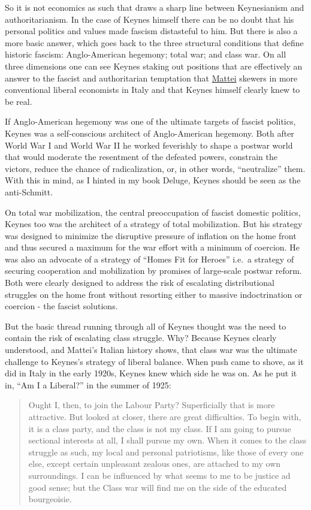 \documentclass[
]{book}
\begin{document}
So it is not economics as such that draws a sharp line between Keynesianism and authoritarianism. In the case of Keynes himself there can be no doubt that his personal politics and values made fascism distasteful to him. But there is also a more basic answer, which goes back to the three structural conditions that define historic fascism: Anglo-American hegemony; total war; and class war. On all three dimensions one can see Keynes staking out positions that are effectively an answer to the fascist and authoritarian temptation that \href{https://jacobin.com/2022/10/mussolini-fascism-liberalism-austerity}{Mattei} skewers in more conventional liberal economists in Italy and that Keynes himself clearly knew to be real.

If Anglo-American hegemony was one of the ultimate targets of fascist politics, Keynes was a self-conscious architect of Anglo-American hegemony. Both after World War I and World War II he worked feverishly to shape a postwar world that would moderate the resentment of the defeated powers, constrain the victors, reduce the chance of radicalization, or, in other words, ``neutralize'' them. With this in mind, as I hinted in my book Deluge, Keynes should be seen as the anti-Schmitt.

On total war mobilization, the central preoccupation of fascist domestic politics, Keynes too was the architect of a strategy of total mobilization. But his strategy was designed to minimize the disruptive pressure of inflation on the home front and thus secured a maximum for the war effort with a minimum of coercion. He was also an advocate of a strategy of ``Homes Fit for Heroes'' i.e.~a strategy of securing cooperation and mobilization by promises of large-scale postwar reform. Both were clearly designed to address the risk of escalating distributional struggles on the home front without resorting either to massive indoctrination or coercion - the fascist solutions.

But the basic thread running through all of Keynes thought was the need to contain the risk of escalating class struggle. Why? Because Keynes clearly understood, and Mattei's Italian history shows, that class war was the ultimate challenge to Keynes's strategy of liberal balance. When push came to shove, as it did in Italy in the early 1920s, Keynes knew which side he was on. As he put it in, ``Am I a Liberal?'' in the summer of 1925:

\begin{quote}
Ought I, then, to join the Labour Party? Superficially that is more attractive. But looked at closer, there are great difficulties. To begin with, it is a class party, and the class is not my class. If I am going to pursue sectional interests at all, I shall pursue my own. When it comes to the class struggle as such, my local and personal patriotisms, like those of every one else, except certain unpleasant zealous ones, are attached to my own surroundings. I can be influenced by what seems to me to be justice ad good sense; but the Class war will find me on the side of the educated bourgeoisie.
\end{quote}
\end{document}
